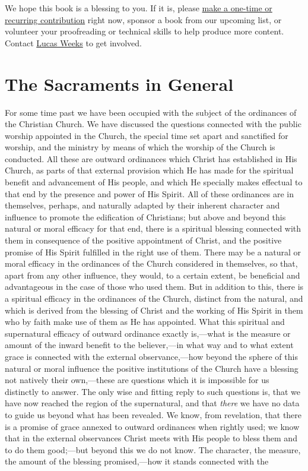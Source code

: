 \documentclass[
  english,
]{book}
\begin{document}
We hope this book is a blessing to you. If it is, please \href{https://warhornmedia.com/give}{make a one-time or recurring contribution} right now, sponsor a book from our upcoming list, or volunteer your proofreading or technical skills to help produce more content. Contact \href{mailto:lucas@beggarsborn.com}{Lucas Weeks} to get involved.

\clearpage
\setcounter{page}{1}

\hypertarget{the-sacraments-in-general}{%
\chapter{The Sacraments in General}\label{the-sacraments-in-general}}

For some time past we have been occupied with the subject of the ordinances of the Christian Church. We have discussed the questions connected with the public worship appointed in the Church, the special time set apart and sanctified for worship, and the ministry by means of which the worship of the Church is conducted. All these are outward ordinances which Christ has established in His Church, as parts of that external provision which He has made for the spiritual benefit and advancement of His people, and which He specially makes effectual to that end by the presence and power of His Spirit. All of these ordinances are in themselves, perhaps, and naturally adapted by their inherent character and influence to promote the edification of Christians; but above and beyond this natural or moral efficacy for that end, there is a spiritual blessing connected with them in consequence of the positive appointment of Christ, and the positive promise of His Spirit fulfilled in the right use of them. There may be a natural or moral efficacy in the ordinances of the Church considered in themselves, so that, apart from any other influence, they would, to a certain extent, be beneficial and advantageous in the case of those who used them. But in addition to this, there is a spiritual efficacy in the ordinances of the Church, distinct from the natural, and which is derived from the blessing of Christ and the working of His Spirit in them who by faith make use of them as He has appointed. What this spiritual and supernatural efficacy of outward ordinance exactly is,---what is the measure or amount of the inward benefit to the believer,---in what way and to what extent grace is connected with the external observance,---how beyond the sphere of this natural or moral influence the positive institutions of the Church have a blessing not natively their own,---these are questions which it is impossible for us distinctly to answer. The only wise and fitting reply to such questions is, that we have now reached the region of the supernatural, and that \emph{there} we have no data to guide us beyond what has been revealed. We know, from revelation, that there is a promise of grace annexed to outward ordinances when rightly used; we know that in the external observances Christ meets with His people to bless them and to do them good;---but beyond this we do not know. The character, the measure, the amount of the blessing promised,---how it stands connected with the 
\end{document}
